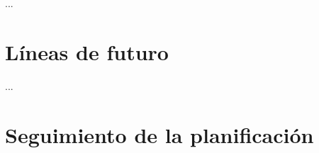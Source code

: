 \documentclass[IB,BIB]{TFUOC}%
\begin{document}
% 

...


\section{Líneas de futuro}
\label{sec:Líneas de futuro}


...


\section{Seguimiento de la planificación}
\label{sec:Seguimiento de la planificación}

\end{document}
